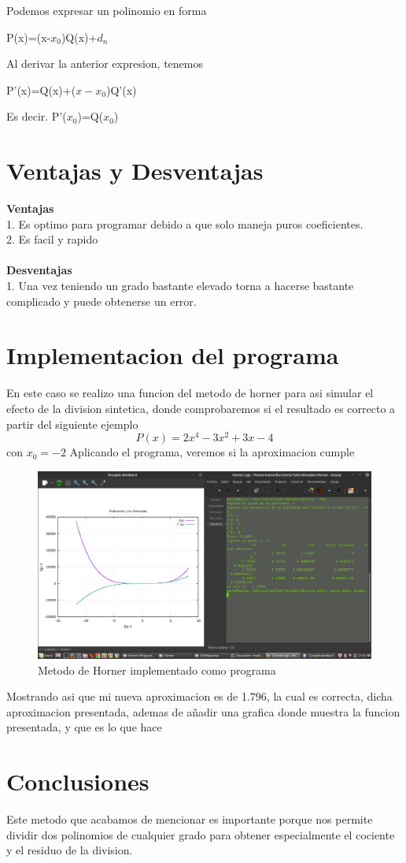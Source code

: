 \documentclass{article}
\begin{document}
\begin{multicols}{2}
Podemos expresar un polinomio en forma
\begin{center}
P(x)=(x-$x_{0}$)Q(x)+$d_{n}$
\end{center}

Al derivar la anterior expresion, tenemos 
\begin{center}
P'(x)=Q(x)+($x-x_{0}$)Q'(x)
\end{center}
Es decir. P'($x_{0}$)=Q($x_{0}$)

\section{Ventajas y Desventajas}
\label{sec:Ven}
\textbf{Ventajas}
\\
1. Es optimo para programar debido a que solo maneja puros coeficientes.
\\
2. Es facil y rapido
\\
\\
\textbf{Desventajas}
\\
1. Una vez teniendo un grado bastante elevado torna a hacerse bastante complicado y  puede obtenerse un error.
\section{Implementacion del programa}
\label{sec:Imp}
En este caso se realizo una funcion del metodo de horner para asi simular el efecto de la division sintetica, donde comprobaremos si el resultado es correcto a partir del siguiente ejemplo
\begin{equation}
P(x)=2x^{4}-3x^{2}+3x-4
\end{equation}
con $x_{0}=-2$
Aplicando el programa, veremos si la aproximacion cumple
\begin{figure}[H]
\centering
\includegraphics[scale=.125]{Horner.png}
\caption{Metodo de Horner implementado como programa}
\end{figure}
Mostrando asi que mi nueva aproximacion es de 1.796, la cual es correcta, dicha aproximacion presentada, ademas de añadir una grafica donde muestra la funcion presentada, y que es lo que hace

\section{Conclusiones}
\label{sec:Conclu}
Este metodo que acabamos de mencionar es importante porque nos permite dividir dos polinomios de cualquier grado para obtener especialmente el cociente y el residuo de la division.
\end{multicols}
\end{document}
